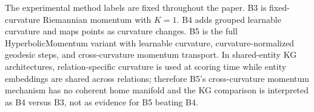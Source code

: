 The experimental method labels are fixed throughout the paper. B3 is fixed-curvature Riemannian momentum with $K=1$. B4 adds grouped learnable curvature and maps points as curvature changes. B5 is the full HyperbolicMomentum variant with learnable curvature, curvature-normalized geodesic steps, and cross-curvature momentum transport. In shared-entity KG architectures, relation-specific curvature is used at scoring time while entity embeddings are shared across relations; therefore B5's cross-curvature momentum mechanism has no coherent home manifold and the KG comparison is interpreted as B4 versus B3, not as evidence for B5 beating B4.
